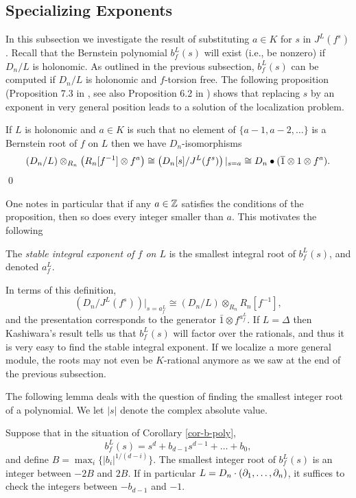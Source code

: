 \subsection{Specializing Exponents}
In this subsection we investigate the result of substituting $a\in K$
for $s$ in $J^L(f^s)$.
Recall that the Bernstein polynomial $b^L_f(s)$  
will exist (i.e., be nonzero) if $D_n/L$ 
is holonomic. As outlined in the previous subsection, $b^L_f(s)$ can
be computed if $D_n/L$ is holonomic and $f$-torsion free. 
The following proposition 
(Proposition 7.3 in \cite{DM:Oa3}, see also Proposition 6.2 in \cite{DM:K})
 shows that replacing $s$ by an
exponent in very general position 
leads to a solution of the localization problem.

\begin{proposition}
If $L$ is holonomic and $a\in K$ is such that 
no element of $\{a-1,a-2,\ldots\}$ is a Bernstein
root of $f$ on $L$ then we have $D_n$-isomorphisms 
\begin{equation}
(D_n/L)\otimes_{R_n}\left( R_n[f^{-1}]\otimes f^a\right)
\cong \left(D_n[s]/J^L(f^s)\right)|_{s=a}\cong D_n\bullet
(\overline{1} \otimes 1\otimes f^a).
\end{equation}
\qed
\end{proposition}
One notes in particular that
if any $a\in{\mathbb Z} $ satisfies the conditions of the
proposition, then so does every integer smaller than $a$. This
motivates the following 
\begin{definition}
The {\em stable integral exponent of $f$ on $L$} is the smallest
integral root of $b^L_f(s)$, and denoted $a^L_f$.
\end{definition}
In terms of this definition, 
\[
\left(D_n/J^L(f^s)\right)|_{s=a^L_f}\cong
(D_n/L)\otimes_{R_n}R_n[f^{-1}],
\]
and the presentation corresponds to the generator $\bar 1\otimes
f^{a^L_f}$. 
If $L=\Delta$ then Kashiwara's result tells us that $b^L_f(s)$ will
factor over the rationals, and thus it is very easy to find the stable
integral exponent. If we localize a more general module, 
the roots  may not even be
$K$-rational anymore as we saw at the end of the previous subsection. 

The following lemma deals with the question of finding the smallest
integer root of a polynomial. We let $|s|$ denote the complex absolute
value. 
\begin{lemma}
Suppose that in the situation of Corollary \ref{cor-b-poly}, 
\[
b^L_f(s)=s^d+b_{d-1}s^{d-1}+\dots+b_0,
\]
and define 
$B=\max_{i}\{|b_i|^{1/(d-i)}\}$.
The smallest integer root of $b^L_f(s)$ is an integer between $-2B$
and $2B$. 
If in particular $L=D_n\cdot 
(\partial_1,\ldots,\partial_n)$, it suffices to check the
integers between $-b_{d-1}$ and $-1$.
\end{lemma}


